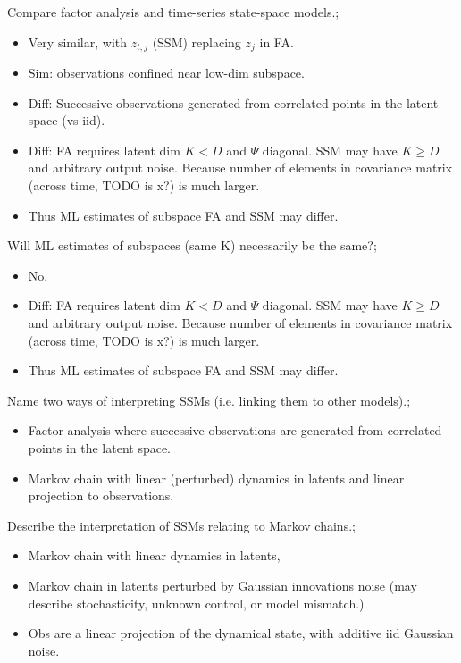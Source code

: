 \documentclass{article}
\begin{document}
Compare factor analysis and time-series state-space models.; \begin{itemize}
    \item Very similar, with $z_{t,j}$ (SSM) replacing $z_j$ in FA.
    \item Sim: observations confined near low-dim subspace.
    \item Diff: Successive observations generated from correlated points in the latent space (vs iid).
    \item Diff: FA requires latent dim $K<D$ and $\Psi$ diagonal. SSM may have $K\geq D$ and arbitrary output noise. Because number of elements in covariance matrix (across time, TODO is x?) is much larger.
    \item Thus ML estimates of subspace FA and SSM may differ.
\end{itemize}

Will ML estimates of subspaces (same K) necessarily be the same?; \begin{itemize}
    \item No.
    \item Diff: FA requires latent dim $K<D$ and $\Psi$ diagonal. SSM may have $K\geq D$ and arbitrary output noise. Because number of elements in covariance matrix (across time, TODO is x?) is much larger.
    \item Thus ML estimates of subspace FA and SSM may differ.
\end{itemize}

Name two ways of interpreting SSMs (i.e. linking them to other models).; \begin{itemize}
    \item Factor analysis where successive observations are generated from correlated points in the latent space.
    \item Markov chain with linear (perturbed) dynamics in latents and linear projection to observations.
\end{itemize}
Describe the interpretation of SSMs relating to Markov chains.; \begin{itemize}
    \item Markov chain with linear dynamics in latents, 
    \item Markov chain in latents perturbed by Gaussian innovations noise (may describe stochasticity, unknown control, or model mismatch.)
    \item Obs are a linear projection of the dynamical state, with additive iid Gaussian noise.
\end{itemize}
\end{document}

